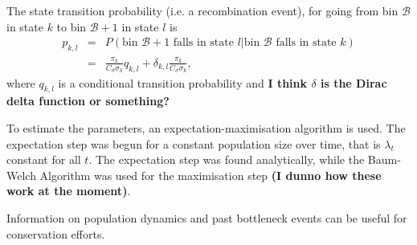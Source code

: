 \documentclass[12pt]{article}
\newcommand{\B}{\mathcal B}
\begin{document}
The state transition probability (i.e. a recombination event), for going from bin $\B$ in state $k$ to bin $\B+1$ in state $l$ is
\begin{eqnarray}
  p_{k,l}&=&P(\text{bin $\B+1$ falls in state $l$}|\text{bin $\B$ falls in state $k$}) \nonumber \\
  &=& \frac{\pi_k}{C_\sigma\sigma_k}q_{k,l}+\delta_{k,l}\frac{\pi_k}{C_\sigma\sigma_k},
\end{eqnarray}
where $q_{k,l}$ is a conditional transition probability and \textbf{I think $\delta$ is the Dirac delta function or something?}

To estimate the parameters, an expectation-maximisation algorithm is used. The expectation step was begun for a constant population size over time, that is $\lambda_t$ constant for all $t$. The expectation step was found analytically, while the Baum-Welch Algorithm was used for the maximisation step \textbf{(I dunno how these work at the moment)}.

Information on population dynamics and past bottleneck events can be useful for conservation efforts.
%
\end{document}

